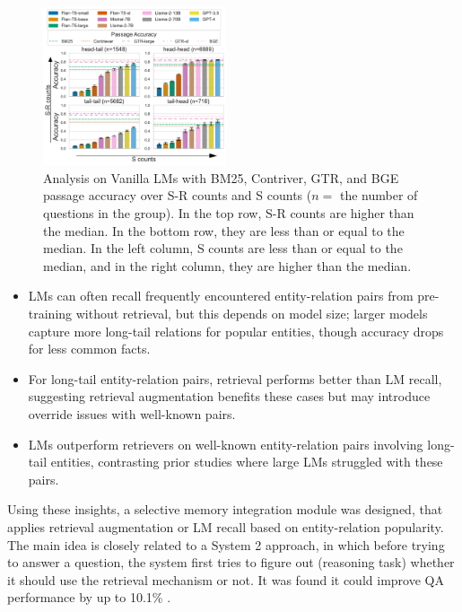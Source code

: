 \begin{figure}[th!]
    \centering
    \includegraphics[width=0.48\textwidth]{submissions/Estevam2024/figures/head_tail_witqa200_for_vanilla_gtr.pdf}
    \caption{Analysis on Vanilla LMs with BM25, Contriver, GTR, and BGE passage accuracy over S-R counts and S counts ($n=$ the number of questions in the group). In the top row, S-R counts are higher than the median. In the bottom row, they are less than or equal to the median. In the left column, S counts are less than or equal to the median, and in the right column, they are higher than the median.} 
    \label{fg:head_tail_vanilla}
\end{figure}

\begin{itemize}
    \item LMs can often recall frequently encountered entity-relation pairs from pre-training without retrieval, but this depends on model size; larger models capture more long-tail relations for popular entities, though accuracy drops for less common facts.
    \item For long-tail entity-relation pairs, retrieval performs better than LM recall, suggesting retrieval augmentation benefits these cases but may introduce override issues with well-known pairs.
    \item LMs outperform retrievers on well-known entity-relation pairs involving long-tail entities, contrasting prior studies where large LMs struggled with these pairs.
\end{itemize}

\noindent
Using these insights, a selective memory integration module was designed, that applies retrieval augmentation or LM recall based on entity-relation popularity. The main idea is closely related to a System 2 approach, in which before trying to answer a question, the system first tries to figure out (reasoning task) whether it should use the retrieval mechanism or not.  It was found it could improve QA performance by up to 10.1\% \cite{maekawa-etal-2024-retrieval}.

